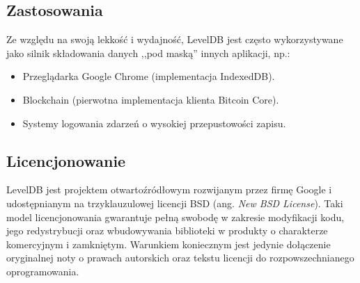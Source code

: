 \subsection{Zastosowania}
Ze względu na swoją lekkość i wydajność, LevelDB jest często wykorzystywane jako silnik składowania danych ,,pod maską'' innych aplikacji, np.:
\begin{itemize}
    \item Przeglądarka Google Chrome (implementacja IndexedDB).
    \item Blockchain (pierwotna implementacja klienta Bitcoin Core).
    \item Systemy logowania zdarzeń o wysokiej przepustowości zapisu.
\end{itemize}

\subsection{Licencjonowanie}
LevelDB jest projektem otwartoźródłowym rozwijanym przez firmę Google i udostępnianym na trzyklauzulowej licencji BSD (ang. \emph{New BSD License}). Taki model licencjonowania gwarantuje pełną swobodę w zakresie modyfikacji kodu, jego redystrybucji oraz wbudowywania biblioteki w produkty o charakterze komercyjnym i zamkniętym. Warunkiem koniecznym jest jedynie dołączenie oryginalnej noty o prawach autorskich oraz tekstu licencji do rozpowszechnianego oprogramowania.

